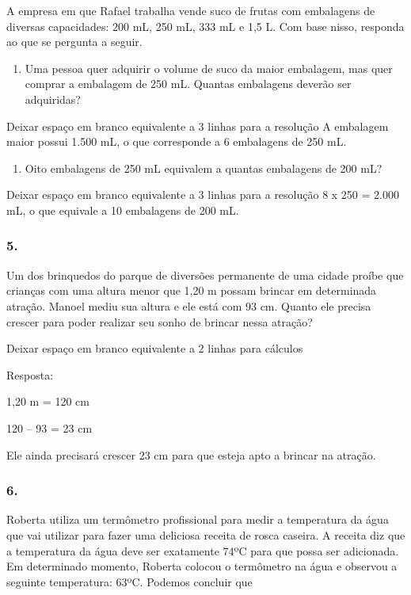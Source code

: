 \begin{enumerate}
\begin{escolha}
\begin{enumerate}
\begin{itemize}
\begin{itemize}
\begin{escolha}
A empresa em que Rafael trabalha vende suco de frutas com embalagens de
diversas capacidades: 200 mL, 250 mL, 333 mL e 1,5 L. Com base nisso, responda ao que se pergunta a seguir.

\begin{enumerate}
\def\labelenumi{\alph{enumi})}
\item
  Uma pessoa quer adquirir o volume de suco da maior embalagem,
  mas quer comprar a embalagem de 250 mL. Quantas embalagens deverão ser adquiridas?
\end{enumerate}

Deixar espaço em branco equivalente a 3 linhas para a resolução
A embalagem maior possui 1.500 mL, o que corresponde a 6 embalagens de 250 mL.

\begin{enumerate}
\def\labelenumi{\alph{enumi})}
\item
  Oito embalagens de 250 mL equivalem a quantas embalagens de 200 mL?
\end{enumerate}

Deixar espaço em branco equivalente a 3 linhas para a resolução
8 x 250 = 2.000 mL, o que equivale a 10 embalagens de 200 mL.


\subsubsection{5.}\label{section-43}

Um dos brinquedos do parque de diversões permanente de uma cidade proíbe
que crianças com uma altura menor que 1,20 m possam brincar em determinada
atração. Manoel mediu sua altura e ele está com 93 cm. Quanto ele
precisa crescer para poder realizar seu sonho de brincar nessa atração?

Deixar espaço em branco equivalente a 2 linhas para cálculos

Resposta:

1,20 m = 120 cm

120 -- 93 = 23 cm

Ele ainda precisará crescer 23 cm para que esteja apto a brincar na atração.

\subsubsection{6.}\label{section-44}

Roberta utiliza um termômetro profissional para medir a temperatura da
água que vai utilizar para fazer uma deliciosa receita de rosca
caseira. A receita diz que a temperatura da água deve ser exatamente 74ºC
para que possa ser adicionada. Em determinado momento, Roberta colocou
o termômetro na água e observou a seguinte temperatura: 63ºC. Podemos concluir que


\end{escolha}
\end{itemize}
\end{itemize}
\end{enumerate}
\end{escolha}
\end{enumerate}
